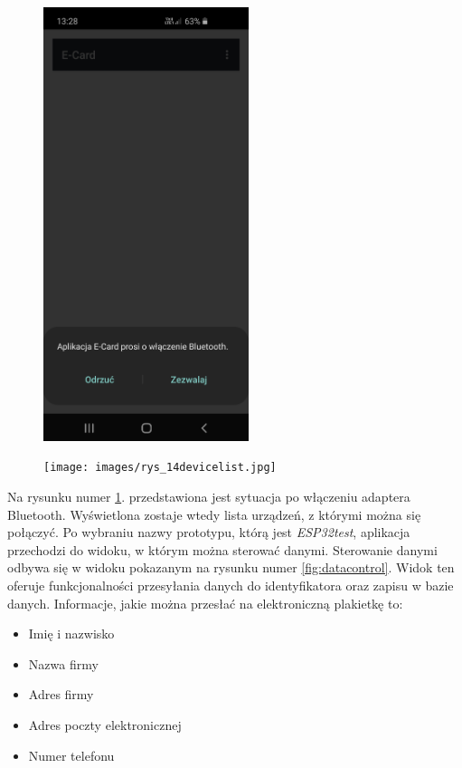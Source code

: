 \documentclass[a4paper,12pt, twoside]{article}
\begin{document}
    	\begin{figure}[H]
    	\centering
    	\begin{minipage}{.5\textwidth}
    	    \centering
    	    \includegraphics[width=6cm]{images/rys_13bluetoothdialog.jpg}
            \label{fig:bton}
        \end{minipage}%
        \begin{minipage}{.5\textwidth}
            \centering
    	    \texttt{[image: images/rys\_14devicelist.jpg]}
            \label{fig:btdevices}
        \end{minipage}
    	\end{figure}
    	\vspace{.5cm}
    	
    	Na rysunku numer \ref{fig:btdevices}. przedstawiona jest sytuacja po włączeniu adaptera Bluetooth. Wyświetlona zostaje wtedy lista urządzeń, z którymi można się połączyć. Po wybraniu nazwy prototypu, którą jest \textit{ESP32test}, aplikacja przechodzi do widoku, w którym można sterować danymi.
    	\newpage
    	Sterowanie danymi odbywa się w widoku pokazanym na rysunku numer \ref{fig:datacontrol}. Widok ten oferuje funkcjonalności przesyłania danych do identyfikatora oraz zapisu w bazie danych. Informacje, jakie można przesłać na elektroniczną plakietkę to:
    	\begin{itemize}
    	    \item Imię i nazwisko
    	    \item Nazwa firmy
    	    \item Adres firmy
    	    \item Adres poczty elektronicznej
    	    \item Numer telefonu
    	\end{itemize}
    	
\end{document}
